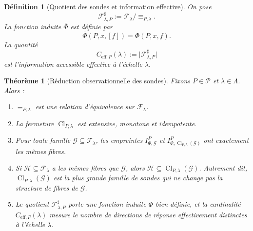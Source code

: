 \documentclass[11pt,a4paper]{article}
\newtheorem{definition}{Définition}
\newtheorem{theorem}{Théorème}
\begin{document}
\begin{definition}[Quotient des sondes et information effective]
On pose
\[
\mathcal F_{\lambda,P}^{\sharp}:=\mathcal F_\lambda/\!\equiv_{P,\lambda}.
\]
La fonction induite \(\bar\Phi\) est définie par
\[
\bar\Phi(P,x,[f])=\Phi(P,x,f).
\]
La quantité
\[
C_{\mathrm{eff},P}(\lambda):=\bigl|\mathcal F_{\lambda,P}^{\sharp}\bigr|
\]
est l'information accessible \emph{effective} à l'échelle \(\lambda\).
\end{definition}

\begin{theorem}[Réduction observationnelle des sondes]
Fixons \(P\in\mathcal P\) et \(\lambda\in\Lambda\). Alors :
\begin{enumerate}[label=\arabic*.]
\item \(\equiv_{P,\lambda}\) est une relation d'équivalence sur \(\mathcal F_\lambda\).
\item La fermeture \(\operatorname{Cl}_{P,\lambda}\) est extensive, monotone et idempotente.
\item Pour toute famille \(\mathcal G\subseteq\mathcal F_\lambda\), les empreintes \(I_{\Phi,\mathcal G}^P\) et \(I_{\Phi,\operatorname{Cl}_{P,\lambda}(\mathcal G)}^P\) ont exactement les mêmes fibres.
\item Si \(\mathcal H\subseteq\mathcal F_\lambda\) a les mêmes fibres que \(\mathcal G\), alors \(\mathcal H\subseteq \operatorname{Cl}_{P,\lambda}(\mathcal G)\). Autrement dit, \(\operatorname{Cl}_{P,\lambda}(\mathcal G)\) est la plus grande famille de sondes qui ne change pas la structure de fibres de \(\mathcal G\).
\item Le quotient \(\mathcal F_{\lambda,P}^{\sharp}\) porte une fonction induite \(\bar\Phi\) bien définie, et la cardinalité \(C_{\mathrm{eff},P}(\lambda)\) mesure le nombre de directions de réponse effectivement distinctes à l'échelle \(\lambda\).
\end{enumerate}
\end{theorem}
\end{document}

